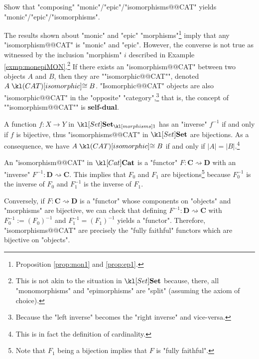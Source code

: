 \documentclass[main.tex]{subfiles}
\begin{document}
\begin{exer}\label{exer:duality:composemor}
	Show that "composing" "monic"/"epic"/"isomorphisms@@CAT" yields "monic"/"epic"/"isomorphisms".
\end{exer}
\begin{rem}
	The results shown about "monic" and "epic" "morphisms"\footnote{Proposition \ref{prop:mon1} and \ref{prop:ep1}.} imply that any "isomorphism@@CAT" is "monic" and "epic". However, the converse is not true as witnessed by the inclusion "morphism" $i$ described in Example \ref{exmp:monepiMON}.\footnote{This is not akin to the situation in $\catSet$ because, there, all "monomorphisms" and "epimorphisms" are "split" (assuming the axiom of choice).} \AP If there exists an "isomorphism@@CAT" between two objects $A$ and $B$, then they are ""isomorphic@@CAT"", denoted $A \isoCAT B$. "Isomorphic@@CAT" objects are also "isomorphic@@CAT" in the "opposite" "category",\footnote{Because the "left inverse" becomes the "right inverse" and vice-versa.} that is, the concept of ""isomorphism@@CAT"" is \textbf{self-dual}.
\end{rem}
\begin{exmp}[$\catSet$]
	A function $f: X \rightarrow Y$ in $\mor{\catSet}$ has an "inverse" $f^{-1}$ if and only if $f$ is bijective, thus "isomorphisms@@CAT" in $\catSet$ are bijections. As a consequence, we have $A \isoCAT B$ if and only if $|A| = |B|$.\footnote{This is in fact the definition of cardinality.}
\end{exmp}
\begin{exmp}[$\catCat$]
	An "isomorphism@@CAT" in $\catCat$ is a "functor" $F:\mathbf{C} \rightsquigarrow \mathbf{D}$ with an "inverse" $F^{-1}: \mathbf{D} \rightsquigarrow \mathbf{C}$. This implies that $F_0$ and $F_1$ are bijections\footnote{Note that $F_1$ being a bijection implies that $F$ is "fully faithful".} because $F_0^{-1}$ is the inverse of $F_0$ and $F_1^{-1}$ is the inverse of $F_1$.

	Conversely, if $F:\mathbf{C} \rightsquigarrow \mathbf{D}$ is a "functor" whose components on "objects" and "morphisms" are bijective, we can check that defining $F^{-1}: \mathbf{D} \rightsquigarrow \mathbf{C}$ with $F_0^{-1} := (F_0)^{-1}$ and $F_1^{-1}= (F_1)^{-1}$ yields a "functor". Therefore, "isomorphisms@@CAT" are precisely the "fully faithful" functors which are bijective on "objects". %
\end{exmp}
\end{document}
